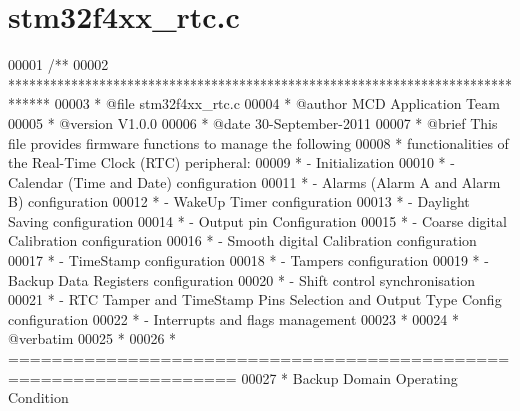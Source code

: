 \section{stm32f4xx\+\_\+rtc.\+c}
\label{stm32f4xx__rtc_8c_source}

\begin{DoxyCode}
00001 \textcolor{comment}{/**}
00002 \textcolor{comment}{  ******************************************************************************}
00003 \textcolor{comment}{  * @file    stm32f4xx\_rtc.c}
00004 \textcolor{comment}{  * @author  MCD Application Team}
00005 \textcolor{comment}{  * @version V1.0.0}
00006 \textcolor{comment}{  * @date    30-September-2011}
00007 \textcolor{comment}{  * @brief   This file provides firmware functions to manage the following }
00008 \textcolor{comment}{  *          functionalities of the Real-Time Clock (RTC) peripheral:}
00009 \textcolor{comment}{  *           - Initialization}
00010 \textcolor{comment}{  *           - Calendar (Time and Date) configuration}
00011 \textcolor{comment}{  *           - Alarms (Alarm A and Alarm B) configuration}
00012 \textcolor{comment}{  *           - WakeUp Timer configuration}
00013 \textcolor{comment}{  *           - Daylight Saving configuration}
00014 \textcolor{comment}{  *           - Output pin Configuration}
00015 \textcolor{comment}{  *           - Coarse digital Calibration configuration}
00016 \textcolor{comment}{  *           - Smooth digital Calibration configuration}
00017 \textcolor{comment}{  *           - TimeStamp configuration}
00018 \textcolor{comment}{  *           - Tampers configuration}
00019 \textcolor{comment}{  *           - Backup Data Registers configuration}
00020 \textcolor{comment}{  *           - Shift control synchronisation    }
00021 \textcolor{comment}{  *           - RTC Tamper and TimeStamp Pins Selection and Output Type Config configuration}
00022 \textcolor{comment}{  *           - Interrupts and flags management}
00023 \textcolor{comment}{  *}
00024 \textcolor{comment}{  *  @verbatim}
00025 \textcolor{comment}{  *}
00026 \textcolor{comment}{  *          ===================================================================}
00027 \textcolor{comment}{  *                               Backup Domain Operating Condition}

\end{DoxyCode}
